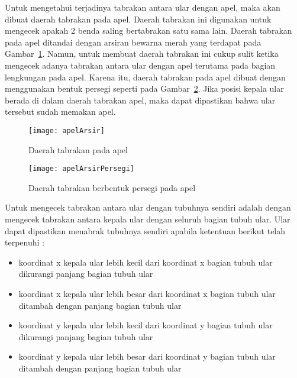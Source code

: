 Untuk mengetahui terjadinya tabrakan antara ular dengan apel, maka akan dibuat daerah tabrakan pada apel. Daerah tabrakan ini digunakan untuk mengecek apakah 2 benda saling bertabrakan satu sama lain. Daerah tabrakan pada apel ditandai dengan arsiran bewarna merah yang terdapat pada Gambar~\ref{fig:apelArsir}. Namun, untuk membuat daerah tabrakan ini cukup sulit ketika mengecek adanya tabrakan antara ular dengan apel terutama pada bagian lengkungan pada apel. Karena itu, daerah tabrakan pada apel dibuat dengan menggunakan bentuk persegi seperti pada Gambar~\ref{fig:apelArsirPersegi}. Jika posisi kepala ular berada di dalam daerah tabrakan apel, maka dapat dipastikan bahwa ular tersebut sudah memakan apel.\\

\begin{figure}[H]
	\centering  
	\texttt{[image: apelArsir]}  
	\caption[Daerah tabrakan pada apel]{Daerah tabrakan pada apel}
	\label{fig:apelArsir} 
\end{figure}

\begin{figure}[H]
	\centering  
	\texttt{[image: apelArsirPersegi]}  
	\caption[Daerah tabrakan berbentuk persegi pada apel]{Daerah tabrakan berbentuk persegi pada apel}
	\label{fig:apelArsirPersegi} 
\end{figure}

Untuk mengecek tabrakan antara ular dengan tubuhnya sendiri adalah dengan mengecek tabrakan antara kepala ular dengan seluruh bagian tubuh ular. Ular dapat dipastikan menabrak tubuhnya sendiri apabila ketentuan berikut telah terpenuhi : 

\begin{itemize}
	\item koordinat x kepala ular lebih kecil dari koordinat x bagian tubuh ular dikurangi panjang bagian tubuh ular
	\item koordinat x kepala ular lebih besar dari koordinat x bagian tubuh ular ditambah dengan panjang bagian tubuh ular
	\item koordinat y kepala ular lebih kecil dari koordinat y bagian tubuh ular dikurangi panjang bagian tubuh ular
	\item koordinat y kepala ular lebih besar dari koordinat y bagian tubuh ular ditambah dengan panjang bagian tubuh ular
\end{itemize}

